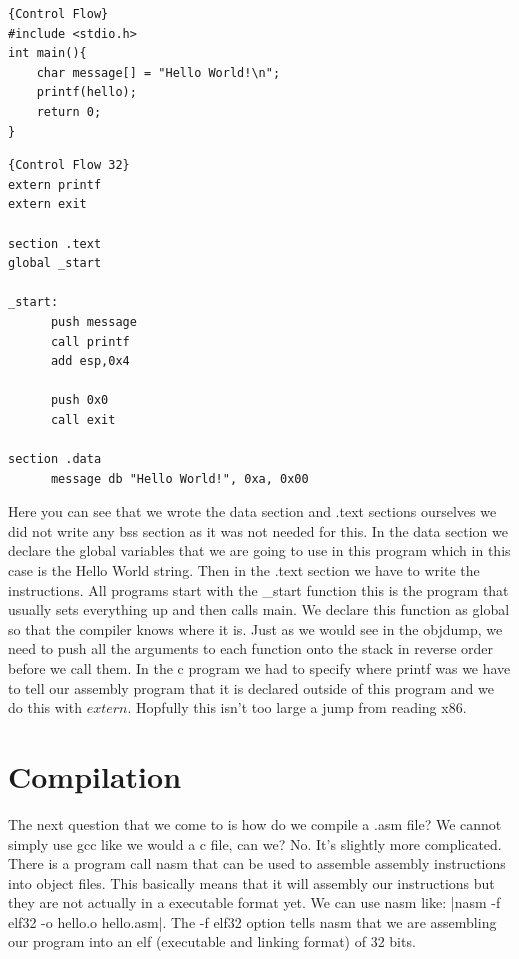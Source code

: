 \documentclass{report}
\begin{document}
\begin{minipage}{.45\textwidth}
\begin{lstlisting}[caption=c hello world,frame=tlrb]{Control Flow}
#include <stdio.h>
int main(){
	char message[] = "Hello World!\n";
	printf(hello);
	return 0;
}
\end{lstlisting}
\end{minipage}\hfill
\begin{minipage}{.45\textwidth}
\begin{lstlisting}[caption=assembly 32bit,frame=tlrb]{Control Flow 32}
extern printf
extern exit

section .text
global _start

_start:
      push message
      call printf
      add esp,0x4

      push 0x0
      call exit

section .data
      message db "Hello World!", 0xa, 0x00

\end{lstlisting}
\end{minipage}

Here you can see that we wrote the data section and .text sections ourselves we did not write any bss section as it was not needed for this.  In the data section we declare the global variables that we are going to use in this program which in this case is the Hello World string.  Then in the .text section we have to write the instructions.  All programs start with the \_start function this is the program that usually sets everything up and then calls main.  We declare this function as global so that the compiler knows where it is. Just as we would see in the objdump, we need to push all the arguments to each function onto the stack in reverse order before we call them.  In the c program we had to specify where printf was we have to tell our assembly program that it is declared outside of this program and we do this with $extern$.  Hopfully this isn't too large a jump from reading x86.   

\section{Compilation}
The next question that we come to is how do we compile a .asm file?  We cannot simply use gcc like we would a c file, can we? No.  It's slightly more complicated.  There is a program call nasm that can be used to assemble assembly instructions into object files.  This basically means that it will assembly our instructions but they are not actually in a executable format yet.  We can use nasm like: |nasm -f elf32 -o hello.o hello.asm|.  The -f elf32 option tells nasm that we are assembling our program into an elf (executable and linking format) of 32 bits.  
\end{document}
